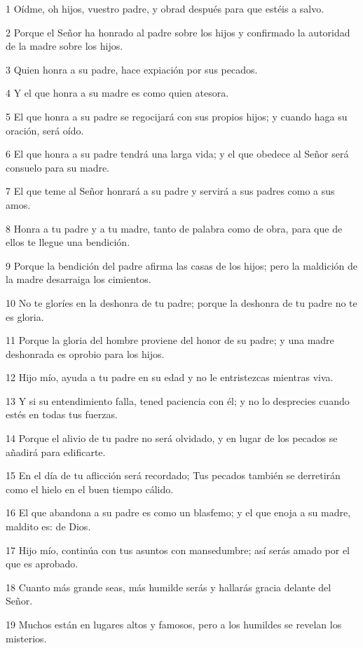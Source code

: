 \par 1 Oídme, oh hijos, vuestro padre, y obrad después para que estéis a salvo.
\par 2 Porque el Señor ha honrado al padre sobre los hijos y confirmado la autoridad de la madre sobre los hijos.
\par 3 Quien honra a su padre, hace expiación por sus pecados.
\par 4 Y el que honra a su madre es como quien atesora.
\par 5 El que honra a su padre se regocijará con sus propios hijos; y cuando haga su oración, será oído.
\par 6 El que honra a su padre tendrá una larga vida; y el que obedece al Señor será consuelo para su madre.
\par 7 El que teme al Señor honrará a su padre y servirá a sus padres como a sus amos.
\par 8 Honra a tu padre y a tu madre, tanto de palabra como de obra, para que de ellos te llegue una bendición.
\par 9 Porque la bendición del padre afirma las casas de los hijos; pero la maldición de la madre desarraiga los cimientos.
\par 10 No te gloríes en la deshonra de tu padre; porque la deshonra de tu padre no te es gloria.
\par 11 Porque la gloria del hombre proviene del honor de su padre; y una madre deshonrada es oprobio para los hijos.
\par 12 Hijo mío, ayuda a tu padre en su edad y no le entristezcas mientras viva.
\par 13 Y si su entendimiento falla, tened paciencia con él; y no lo desprecies cuando estés en todas tus fuerzas.
\par 14 Porque el alivio de tu padre no será olvidado, y en lugar de los pecados se añadirá para edificarte.
\par 15 En el día de tu aflicción será recordado; Tus pecados también se derretirán como el hielo en el buen tiempo cálido.
\par 16 El que abandona a su padre es como un blasfemo; y el que enoja a su madre, maldito es: de Dios.
\par 17 Hijo mío, continúa con tus asuntos con mansedumbre; así serás amado por el que es aprobado.
\par 18 Cuanto más grande seas, más humilde serás y hallarás gracia delante del Señor.
\par 19 Muchos están en lugares altos y famosos, pero a los humildes se revelan los misterios.
